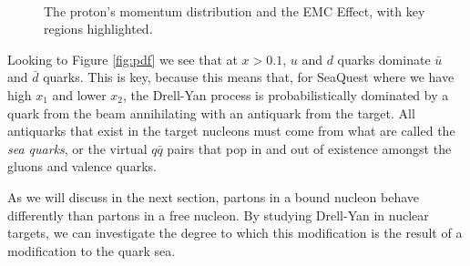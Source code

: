 \documentclass[11pt]{article}
\begin{document}
\begin{figure}
\centering
\mbox{
	\quad
}
\caption{The proton's momentum distribution and the EMC Effect, with key regions highlighted.}
\label{fig:pdf_emc}
\end{figure}

Looking to Figure \ref{fig:pdf} we see that at $x>0.1$, $u$ and $d$ quarks dominate $\bar{u}$ and $\bar{d}$ quarks.  This is key, because this means that, for SeaQuest where we have high $x_1$ and lower $x_2$, the Drell-Yan process is probabilistically dominated by a quark from the beam annihilating with an antiquark from the target. All antiquarks that exist in the target nucleons must come from what are called the \emph{sea quarks}, or the virtual $q\bar{q}$ pairs that pop in and out of existence amongst the gluons and valence quarks. 

As we will discuss in the next section, partons in a bound nucleon behave differently than partons in a free nucleon. By studying Drell-Yan in nuclear targets, we can investigate the degree to which this modification is the result of a modification to the quark sea.
\end{document}
